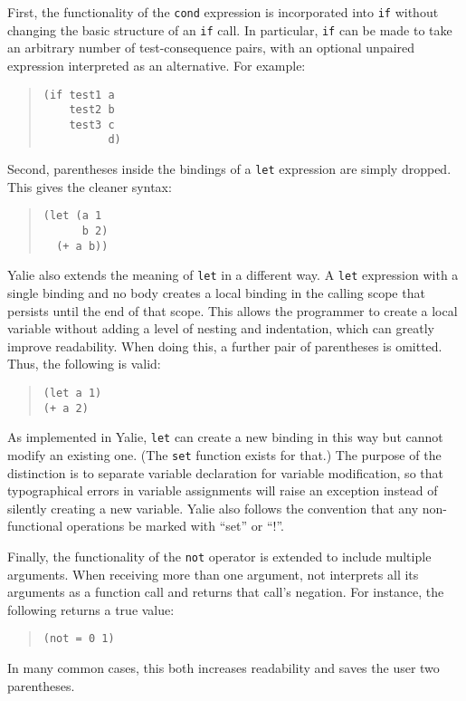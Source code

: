 \documentclass[twocolumn]{article}
\begin{document}
First, the functionality of the \texttt{cond} expression is
incorporated into \texttt{if} without changing the basic structure of
an \texttt{if} call. In particular, \texttt{if} can be made to take an
arbitrary number of test-consequence pairs, with an optional unpaired
expression interpreted as an alternative. For example:
\begin{quote}
\begin{verbatim}
(if test1 a
    test2 b
    test3 c
          d)
\end{verbatim}
\end{quote}

Second, parentheses inside the bindings of a \texttt{let} expression
are simply dropped. This gives the cleaner syntax:
\begin{quote}
\begin{verbatim}
(let (a 1
      b 2)
  (+ a b))
\end{verbatim}
\end{quote}
Yalie also extends the meaning of \texttt{let} in a different way. A
\texttt{let} expression with a single binding and no body creates a
local binding in the calling scope that persists until the end of that
scope. This allows the programmer to create a local variable without
adding a level of nesting and indentation, which can greatly improve
readability. When doing this, a further pair of parentheses is
omitted. Thus, the following is valid:
\begin{quote}
\begin{verbatim}
(let a 1)
(+ a 2)
\end{verbatim}
\end{quote}
As implemented in Yalie, \texttt{let} can create a new binding in this
way but cannot modify an existing one. (The \texttt{set} function
exists for that.) The purpose of the distinction is to separate
variable declaration for variable modification, so that typographical
errors in variable assignments will raise an exception instead of
silently creating a new variable. Yalie also follows the convention
that any non-functional operations be marked with ``set'' or ``!''.

Finally, the functionality of the \texttt{not} operator is extended to
include multiple arguments. When receiving more than one argument, not
interprets all its arguments as a function call and returns that
call's negation. For instance, the following returns a true value:
\begin{quote}
\begin{verbatim}
(not = 0 1)
\end{verbatim}
\end{quote}
In many common cases, this both increases readability and saves the
user two parentheses.
\end{document}
